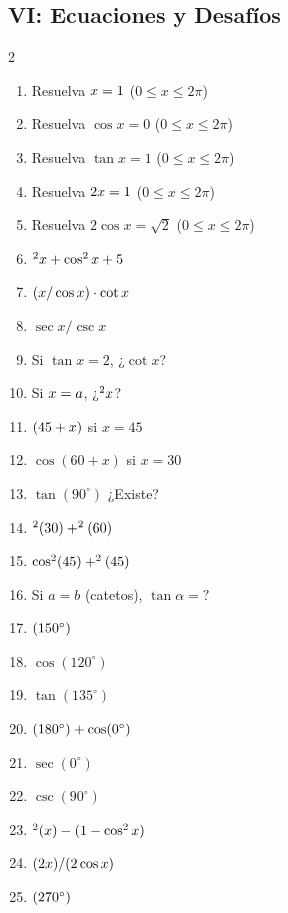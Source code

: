 \documentclass[letterpaper, 12pt]{article}
\let\sin\relax
\DeclareMathOperator{\sin}{sen}
\begin{document}
\subsection*{VI: Ecuaciones y Desafíos}
\begin{multicols}{2}
\begin{enumerate}[label=\textbf{\arabic*.}, start=86]
    \item Resuelva $\sin x = 1$ ($0 \le x \le 2\pi$)
    \item Resuelva $\cos x = 0$ ($0 \le x \le 2\pi$)
    \item Resuelva $\tan x = 1$ ($0 \le x \le 2\pi$)
    \item Resuelva $2\sin x = 1$ ($0 \le x \le 2\pi$)
    \item Resuelva $2\cos x = \sqrt{2}$ ($0 \le x \le 2\pi$)
    \item $\sin^2 x + \cos^2 x + 5$
    \item $(\sin x / \cos x) \cdot \cot x$
    \item $\sec x / \csc x$
    \item Si $\tan x = 2$, ¿$\cot x$?
    \item Si $\sin x = a$, ¿$\sin^2 x$?
    \item $\sin(45+x)$ si $x=45$
    \item $\cos(60+x)$ si $x=30$
    \item $\tan(90^\circ)$ ¿Existe?
    \item $\sin^2(30) + \sin^2(60)$
    \item $\cos^2(45) + \sin^2(45)$
    \item Si $a=b$ (catetos), $\tan \alpha = ?$
    \item $\sin(150^\circ)$
    \item $\cos(120^\circ)$
    \item $\tan(135^\circ)$
    \item $\sin(180^\circ) + \cos(0^\circ)$
    \item $\sec(0^\circ)$
    \item $\csc(90^\circ)$
    \item $\sin^2(x) - (1 - \cos^2 x)$
    \item $\sin(2x) / (2 \cos x)$
    \item $\sin(270^\circ)$
\end{enumerate}
\end{multicols}
\end{document}
